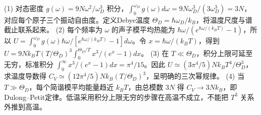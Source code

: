 (1) 对态密度 \(g(\omega)=9N\omega^2/\omega_D^3\) 积分，\(\int_0^{\omega_D}g(\omega)d\omega=9N\omega_D^3/(3\omega_D^3)=3N\)，对应每个原子三个振动自由度。定义Debye温度 \(\Theta_D=\hbar\omega_D/k_B\)，将温度尺度与谱截止联系起来。
(2) 每个频率为 \(\omega\) 的声子模平均热能为 \(\hbar\omega/(e^{\hbar\omega/(k_BT)}-1)\)，所以 \(U=\int_0^{\omega_D}g(\omega)\hbar\omega/[e^{\hbar\omega/(k_BT)}-1]d\omega\)。令 \(x=\hbar\omega/(k_BT)\)，得到 \(U=9Nk_BT(T/\Theta_D)^3\int_0^{\Theta_D/T}x^3/(e^x-1)dx\)。
(3) 在 \(T\ll\Theta_D\)，积分上限可延至无穷，标准积分 \(\int_0^\infty x^3/(e^x-1)dx=\pi^4/15\)。因此 \(U\simeq(3\pi^4/5)Nk_BT^4/\Theta_D^3\)，求温度导数得 \(C_V\simeq(12\pi^4/5)Nk_B(T/\Theta_D)^3\)，呈明确的三次幂规律。
(4) 当 \(T\gg\Theta_D\)，每个简谐模平均能量趋近 \(k_BT\)，由总模数 \(3N\) 得 \(C_V\to3Nk_B\)，即Dulong–Petit定律。低温采用积分上限无穷的步骤在高温不成立，不能把 \(T^3\) 关系外推到高温。
